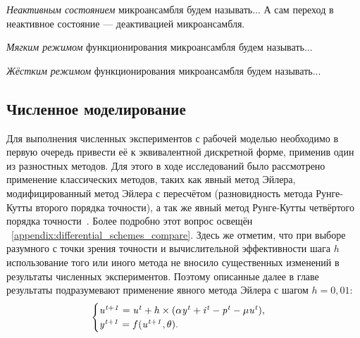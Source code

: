 \begin{Definition}
    \textit{Неактивным состоянием} микроансамбля будем называть...
    А сам переход в неактивное состояние --- деактивацией микроансамбля.
\end{Definition}

\begin{Definition}
    \textit{Мягким режимом} функционирования микроансамбля будем называть...
\end{Definition}

\begin{Definition}
    \textit{Жёстким режимом} функционирования микроансамбля будем называть...
\end{Definition}


%
%


\subsection{Численное моделирование}

Для выполнения численных экспериментов с рабочей моделью необходимо в первую очередь привести её к эквивалентной дискретной форме, применив один из разностных методов. Для этого в ходе исследований было рассмотрено применение классических методов, таких как явный метод Эйлера, модифицированный метод Эйлера с пересчётом (разновидность метода Рунге-Кутты второго порядка точности), а так же явный метод Рунге-Кутты четвёртого порядка точности~\cite{Hairer1990}. Более подробно этот вопрос освещён \inappendix~\ref{appendix:differential_schemes_compare}. Здесь же отметим, что при выборе разумного с точки зрения точности и вычислительной эффективности шага $h$ использование того или иного метода не вносило существенных изменений в результаты численных экспериментов. Поэтому описанные далее в главе результаты подразумевают применение явного метода Эйлера с шагом $h = 0,01$:
\begin{equation*}
    \begin{cases}
        \mathit{u^{t+1}} = \mathit{u^{t}} + h \times ( \alpha\mathit{y^{t}} + \mathit{i^{t}} - \mathit{p^{t}} - \mu\mathit{u^{t}} ), \\ 
        \mathit{y^{t+1}} = f(\mathit{u^{t+1}}, \theta).
    \end{cases}
\end{equation*}


